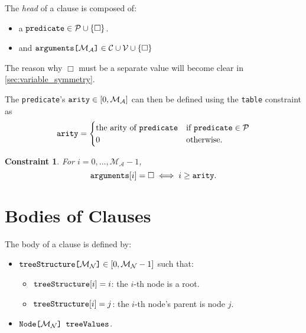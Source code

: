 \documentclass[runningheads]{llncs}
\newtheorem{constraint}{Constraint}
\newcommand{\variable}[1]{\texttt{\textup{#1}}}
\newcommand{\arrayd}[3]{\variable{{#1}[}{#2}\variable{]} \in {#3}}
\newcommand{\arrayt}[3]{\variable{{#3}[}{#2}\variable{] {#1}}}
\newcommand{\predicates}{\mathcal{P}}
\newcommand{\variables}{\mathcal{V}}
\newcommand{\constants}{\mathcal{C}}
\newcommand{\maxArity}{\mathcal{M}_{\mathcal{A}}}
\newcommand{\maxNumNodes}{\mathcal{M}_{\mathcal{N}}}
\begin{document}
\begin{definition}
  The \emph{head} of a clause is composed of:
  \begin{itemize}
  \item a $\variable{predicate} \in \predicates \cup \{ \Box \}$.
  \item and $\arrayd{arguments}{\maxArity{}}{\constants{} \cup \variables{}}
    \cup \{ \Box \}$
  \end{itemize}
\end{definition}
The reason why $\Box$ must be a separate value will become clear in
\cref{sec:variable_symmetry}.

\begin{definition} \label{def:arity}
  The \variable{predicate}'s $\variable{arity} \in [0, \maxArity{}]$ can then be
  defined using the \variable{table} constraint as
  \[
    \variable{arity} = \begin{cases}
      \text{the arity of } \variable{predicate} & \text{if }
      \variable{predicate} \in \predicates{}\\
      0 & \text{otherwise.}
    \end{cases}
  \]
\end{definition}

\begin{constraint} \label{constr:arity}
  For $i = 0, \dots, \maxArity{} - 1$,
  \[
    \variable{arguments}[i] = \Box \iff i \ge \variable{arity}.
  \]
\end{constraint}

\section{Bodies of Clauses}

\begin{definition}
  The body of a clause is defined by:
  \begin{itemize}
  \item $\arrayd{treeStructure}{\maxNumNodes{}}{[0, \maxNumNodes{} - 1]}$ such
    that:
    \begin{itemize}
    \item $\variable{treeStructure}[i] = i$: the $i$-th node is a root.
    \item $\variable{treeStructure}[i] = j$: the $i$-th node's parent is node $j$.
    \end{itemize}
  \item $\arrayt{treeValues}{\maxNumNodes{}}{Node}$.
  \end{itemize}
\end{definition}
\end{document}
